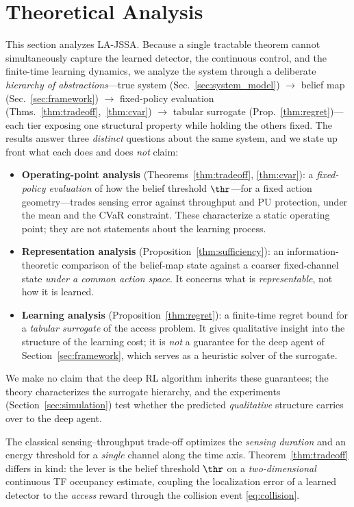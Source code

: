 \section{Theoretical Analysis}
\label{sec:theory}

This section analyzes LA-JSSA. Because a single tractable theorem cannot
simultaneously capture the learned detector, the continuous control, and the
finite-time learning dynamics, we analyze the system through a deliberate
\emph{hierarchy of abstractions}---true system (Sec.~\ref{sec:system_model})
$\to$ belief map (Sec.~\ref{sec:framework}) $\to$ fixed-policy evaluation
(Thms.~\ref{thm:tradeoff},~\ref{thm:cvar}) $\to$ tabular surrogate
(Prop.~\ref{thm:regret})---each tier exposing one structural property while
holding the others fixed. The results answer three \emph{distinct} questions
about the same system, and we state up front what each does and does
\emph{not} claim:
\begin{itemize}
\item \textbf{Operating-point analysis} (Theorems~\ref{thm:tradeoff},
\ref{thm:cvar}): a \emph{fixed-policy evaluation} of how the belief threshold
$\thr$---for a fixed action geometry---trades sensing error against
throughput and PU protection, under the mean and the CVaR constraint. These
characterize a static operating point; they are not statements about the
learning process.
\item \textbf{Representation analysis} (Proposition~\ref{thm:sufficiency}):
an information-theoretic comparison of the belief-map state against a coarser
fixed-channel state \emph{under a common action space}. It concerns what is
\emph{representable}, not how it is learned.
\item \textbf{Learning analysis} (Proposition~\ref{thm:regret}): a finite-time
regret bound for a \emph{tabular surrogate} of the access problem. It gives
qualitative insight into the structure of the learning cost; it is
\emph{not} a guarantee for the deep agent of Section~\ref{sec:framework},
which serves as a heuristic solver of the surrogate.
\end{itemize}
We make no claim that the deep RL algorithm inherits these guarantees; the
theory characterizes the surrogate hierarchy, and the experiments
(Section~\ref{sec:simulation}) test whether the predicted \emph{qualitative}
structure carries over to the deep agent.

\begin{remark}
The classical sensing--throughput trade-off \cite{liang2008sensing} optimizes
the \emph{sensing duration} and an energy threshold for a \emph{single}
channel along the time axis. Theorem~\ref{thm:tradeoff} differs in kind: the
lever is the belief threshold $\thr$ on a \emph{two-dimensional} continuous
TF occupancy estimate, coupling the localization error of a learned detector
to the \emph{access} reward through the collision event
\eqref{eq:collision}.
\end{remark}

